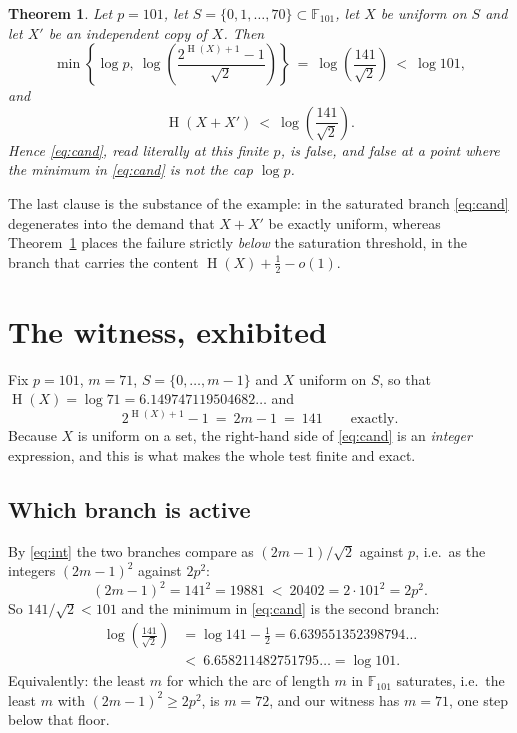 \documentclass[11pt]{amsart}
\newtheorem{theorem}{Theorem}
\theoremstyle{remark}
\DeclareMathOperator{\Ent}{H}
\begin{document}
\begin{theorem}\label{thm:main}
Let $p=101$, let $S=\{0,1,\dots,70\}\subset\mathbb F_{101}$, let $X$ be
uniform on $S$ and let $X'$ be an independent copy of $X$.  Then
\[
  \min\left\{\log p,\ \log\!\left(\frac{2^{\Ent(X)+1}-1}{\sqrt2}\right)\right\}
  \ =\ \log\!\left(\frac{141}{\sqrt2}\right)\ <\ \log 101 ,
\]
and
\[
  \Ent(X+X')\ <\ \log\!\left(\frac{141}{\sqrt2}\right).
\]
Hence \eqref{eq:cand}, read literally at this finite $p$, is false, and false
at a point where the minimum in \eqref{eq:cand} is \emph{not} the cap
$\log p$.
\end{theorem}

The last clause is the substance of the example: in the saturated branch
\eqref{eq:cand} degenerates into the demand that $X+X'$ be exactly uniform,
whereas Theorem~\ref{thm:main} places the failure strictly \emph{below} the
saturation threshold, in the branch that carries the content
$\Ent(X)+\frac12-o(1)$.

\section{The witness, exhibited}

Fix $p=101$, $m=71$, $S=\{0,\dots,m-1\}$ and $X$ uniform on $S$, so that
$\Ent(X)=\log 71=6.149747119504682\ldots$ and
\begin{equation}\label{eq:int}
  2^{\Ent(X)+1}-1\ =\ 2m-1\ =\ 141 \qquad\text{exactly.}
\end{equation}
Because $X$ is uniform on a set, the right-hand side of \eqref{eq:cand} is an
\emph{integer} expression, and this is what makes the whole test finite and
exact.

\subsection*{Which branch is active}
By \eqref{eq:int} the two branches compare as
$(2m-1)/\sqrt2$ against $p$, i.e.\ as the integers $(2m-1)^2$ against $2p^2$:
\begin{equation}\label{eq:branch}
  (2m-1)^2 = 141^2 = 19881
  \ <\ 20402 = 2\cdot 101^2 = 2p^2 .
\end{equation}
So $141/\sqrt2<101$ and the minimum in \eqref{eq:cand} is the second branch:
\begin{align*}
  \log\!\left(\frac{141}{\sqrt2}\right)&=\log 141-\tfrac12
   =6.639551352398794\ldots\\
  &<\ 6.658211482751795\ldots=\log 101 .
\end{align*}
Equivalently: the least $m$ for which the arc of length $m$ in
$\mathbb F_{101}$ saturates, i.e.\ the least $m$ with $(2m-1)^2\ge 2p^2$, is
$m=72$, and our witness has $m=71$, one step below that floor.
\end{document}
